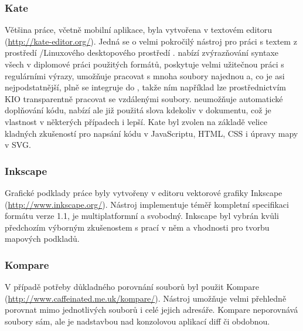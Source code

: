 \subsubsection{Kate}
Většina práce, včetně mobilní aplikace, byla vytvořena v textovém editoru  (\url{http://kate-editor.org/}). Jedná se o velmi pokročilý nástroj pro práci s textem z prostředí /Linuxového desktopového prostředí .  nabízí zvýrazňování syntaxe všech v diplomové práci použitých formátů, poskytuje velmi užitečnou práci s regulárními výrazy, umožňuje pracovat s mnoha soubory najednou a, co je asi nejpodstatnější, plně se integruje do , takže ním například lze prostřednictvím \gls{KIO} transparentně pracovat se vzdálenými soubory.  neumožňuje automatické doplňování kódu, nabízí ale již použitá slova kdekoliv v dokumentu, což je vlastnost v některých případech i lepší. Kate byl zvolen na základě velice kladných zkušeností pro napsání kódu v JavaScriptu, \gls{HTML}, \gls{CSS} i úpravy mapy v \gls{SVG}.

\subsubsection{Inkscape}
Grafické podklady práce byly vytvořeny v editoru vektorové grafiky Inkscape (\url{http://www.inkscape.org/}). Nástroj implementuje téměř kompletní specifikaci formátu  verze 1.1, je multiplatformní a svobodný. Inkscape byl vybrán kvůli předchozím výborným zkušenostem s prací v něm a vhodnosti pro tvorbu mapových podkladů.

\subsubsection{Kompare}
V případě potřeby důkladného porovnání souborů byl použit Kompare (\url{http://www.caffeinated.me.uk/kompare/}). Nástroj umožňuje velmi přehledně porovnat mimo jednotlivých souborů i celé jejich adresáře. Kompare neporovnává soubory sám, ale je nadstavbou nad konzolovou aplikací diff či obdobnou.

